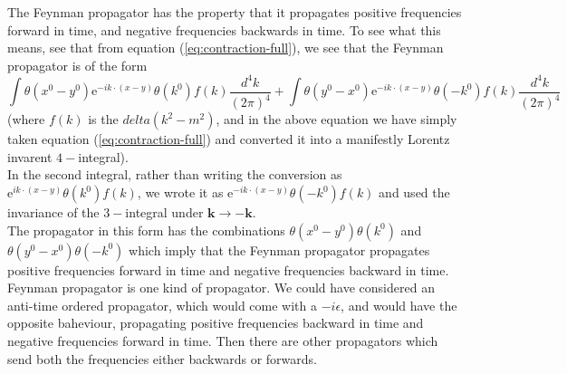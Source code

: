 \documentclass[11pt]{article}
\newcommand{\e}{\mathrm{e}}
\numberwithin{equation}{section}
\begin{document}
    The Feynman propagator has the property that it propagates positive frequencies forward in time, and negative frequencies backwards in time. To see what this means, see that from equation (\ref{eq:contraction-full}), we see that the Feynman propagator is of the form 
    \begin{equation*}
        \int \theta(x^0 - y^0)  \e^{-ik\cdot (x-y)} \theta(k^0) f(k) \frac{d^4k}{(2\pi)^4}  + \int \theta(y^0 - x^0)  \e^{-ik\cdot (x-y)} \theta(-k^0) f(k) \frac{d^4k}{(2\pi)^4}
    \end{equation*}
    (where \(f(k)\) is the \(delta(k^2 - m^2)\), and in the above equation we have simply taken equation (\ref{eq:contraction-full}) and converted it into a manifestly Lorentz invarent \(4-\)integral).\\
    In the second integral, rather than writing the conversion as \(\e^{ik\cdot(x-y)} \theta(k^0) f(k)\), we wrote it as \(\e^{-ik\cdot(x-y)}\theta(-k^0)f(k)\) and used the invariance of the \(3-\)integral under \(\textbf{k}\to -\textbf{k}\). \\
    The propagator in this form has the combinations \(\theta(x^0 - y^0)\theta(k^0)\) and \(\theta(y^0 - x^0)\theta(-k^0)\) which imply that the Feynman propagator propagates positive frequencies forward in time and negative frequencies backward in time.\\

    Feynman propagator is one kind of propagator. We could have considered an anti-time ordered propagator, which would come with a \(-i\epsilon\), and would have the opposite baheviour, propagating positive frequencies backward in time and negative frequencies forward in time. Then there are other propagators which send both the frequencies either backwards or forwards.
\end{document}
